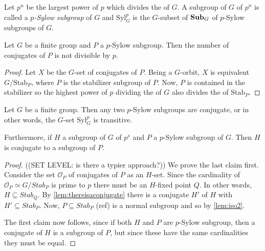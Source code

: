 \begin{definition}
  \label{def:sylowsubgroup}
  Let $p^n$ be the largest power of $p$ which divides the \gporder of $G$.  A subgroup of $G$ of \gporder $p^n$ is called a \emph{$p$-Sylow subgroup} of $G$ and $\mathrm{Syl}_G^p$ is the $G$-subset of $\mathbf{Sub}_G$ of $p$-Sylow subgroups of $G$.
\end{definition}
\begin{lemma}
  \label{lem:numberofconjofSylow}
  Let $G$ be a finite group and $P$ a $p$-Sylow subgroup.  Then the number of conjugates of $P$ is not divisible by $p$.
\end{lemma}
\begin{proof}
  Let $X$ be the $G$-set of conjugates of $P$.  Being a $G$-orbit, $X$ is equivalent $G/\mathrm{Stab}_P$, where $P$ is the stabilizer subgroup of $P$.  Now, $P$ is contained in the stabilizer so the highest power of $p$ dividing the \gporder of $G$ also divides the \gporder of $\mathrm{Stab}_P$.
\end{proof}

\begin{theorem}
  \label{thm:sylow2}%
  \label{lem:sylowsareconjugates}
  Let $G$ be a finite group.  Then any two $p$-Sylow subgroups are conjugate, or in other words,  the $G$-set $\mathrm{Syl}_G^p$ is transitive.
  
Furthermore, if $H$ a subgroup of $G$ of \gporder $p^s$ and $P$ a $p$-Sylow subgroup of $G$.  Then $H$ is conjugate to a subgroup of $P$.
\end{theorem}

\begin{proof}
  ((SET LEVEL: is there a typier approach?))  
  We prove the last claim first.
  Consider the set $\mathcal O_P$ of conjugates of $P$ as an $H$-set.  Since the cardinality of $\mathcal O_P\simeq G/Stab_P$ is prime to $p$ there must be an $H$-fixed point $Q$.  In other words, $H\subseteq Stab_Q$.  By \cref{lem:thereisaconjugate} there is a conjugate $H'$ of $H$ with $H'\subseteq Stab_P$.  Now, $P\subseteq Stab_P$ (ref) is a normal subgroup and so by \cref{lem:iso2}.

The first claim now follows, since if both $H$ and $P$ are $p$-Sylow subgroup, then a conjugate of $H$ is a subgroup of $P$, but since these have the same cardinalities they must be equal. 
\end{proof}





